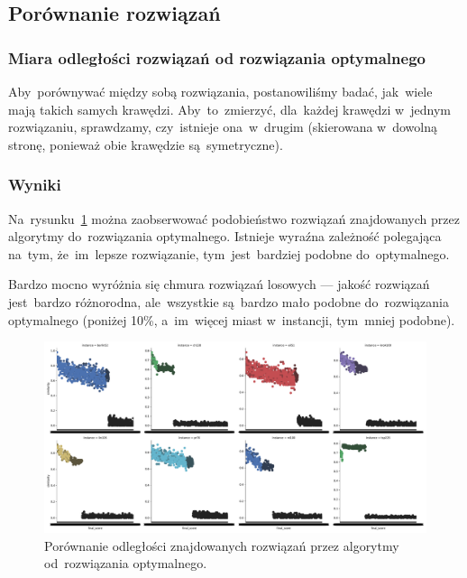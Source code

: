\subsection{Porównanie rozwiązań}

\subsubsection{Miara odległości rozwiązań od rozwiązania optymalnego}

Aby~porównywać między sobą rozwiązania, postanowiliśmy badać, jak~wiele mają takich samych krawędzi. Aby~to~zmierzyć, dla~każdej krawędzi w~jednym rozwiązaniu, sprawdzamy, czy~istnieje ona~w~drugim (skierowana w~dowolną stronę, ponieważ obie krawędzie są~symetryczne).

\subsubsection{Wyniki}

Na~rysunku~\ref{fig:sim} można zaobserwować podobieństwo rozwiązań znajdowanych przez algorytmy do~rozwiązania optymalnego. Istnieje wyraźna zależność polegająca na~tym, że~im~lepsze rozwiązanie, tym~jest~bardziej podobne do~optymalnego.

Bardzo mocno wyróżnia się chmura rozwiązań losowych --- jakość rozwiązań jest~bardzo różnorodna, ale~wszystkie są~bardzo mało podobne do~rozwiązania optymalnego (poniżej 10\%, a~im~więcej miast w~instancji, tym~mniej podobne).

\begin{figure}
\begin{center}
\includegraphics[width=1.0\textwidth]{graphs/similarity_comparision.pdf}
\end{center}
\caption{Porównanie odległości znajdowanych rozwiązań przez algorytmy od~rozwiązania optymalnego.}
\label{fig:sim}
\end{figure}